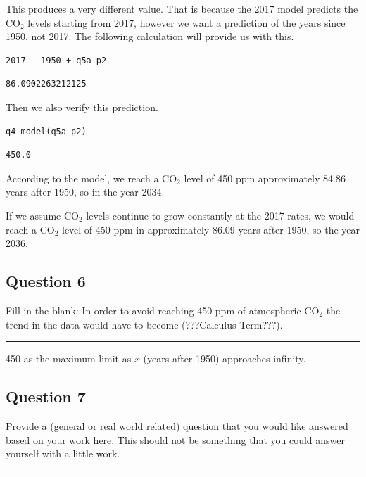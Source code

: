 \documentclass[11pt]{article}
\begin{document}
This produces a very different value.
That is because the 2017 model predicts the CO\(_{\text{2}}\) levels
starting from 2017, however we want a prediction of the
years since 1950, not 2017.
The following calculation will provide us with this.

\begin{verbatim}
2017 - 1950 + q5a_p2
\end{verbatim}

\begin{verbatim}
86.0902263212125
\end{verbatim}

Then we also verify this prediction.

\begin{verbatim}
q4_model(q5a_p2)
\end{verbatim}

\begin{verbatim}
450.0
\end{verbatim}

According to the model, we reach a CO\(_{\text{2}}\) level of 450 ppm
approximately 84.86 years after 1950, so in the year 2034.

If we assume CO\(_{\text{2}}\) levels continue to grow constantly at the
2017 rates, we would reach a CO\(_{\text{2}}\) level of 450 ppm in
approximately 86.09 years after 1950, so the year 2036.

\subsection{Question 6}
\label{sec:org2e4fb62}

Fill in the blank:
In order to avoid reaching 450 ppm of atmospheric CO\(_{\text{2}}\) the
trend in the data would have to become (???Calculus Term???).

\noindent\rule{\textwidth}{0.5pt}

450 as the maximum limit as \(x\) (years after 1950) approaches infinity.

\subsection{Question 7}
\label{sec:orgb99afc8}

Provide a (general or real world related) question that you would
like answered based on your work here.
This should not be something that you could answer yourself with
a little work.

\noindent\rule{\textwidth}{0.5pt}
\end{document}
